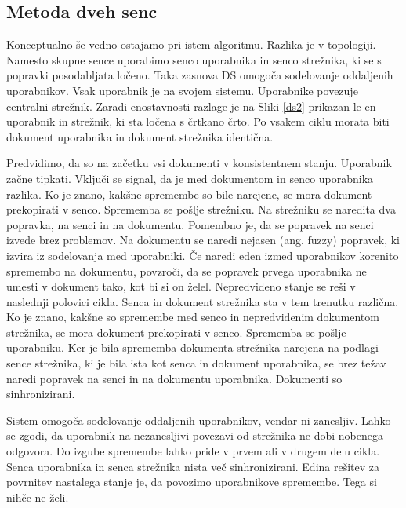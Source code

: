 \documentclass[a4paper, 12pt, twoside]{book}
\begin{document}
\subsection{Metoda dveh senc}

Konceptualno še vedno ostajamo pri istem algoritmu. Razlika je v topologiji. Namesto skupne sence uporabimo senco uporabnika in senco strežnika, ki se s popravki posodabljata ločeno. Taka zasnova DS omogoča sodelovanje oddaljenih uporabnikov. Vsak uporabnik je na svojem sistemu. Uporabnike povezuje centralni strežnik. Zaradi enostavnosti razlage je na Sliki \ref{ds2} prikazan le en uporabnik in strežnik, ki sta ločena s črtkano črto. Po vsakem ciklu morata biti dokument uporabnika in dokument strežnika identična.

Predvidimo, da so na začetku vsi dokumenti v konsistentnem stanju. Uporabnik začne tipkati. Vključi se signal, da je med dokumentom in senco uporabnika razlika. Ko je znano, kakšne spremembe so bile narejene, se mora dokument prekopirati v senco. Sprememba se pošlje strežniku. Na strežniku se naredita dva popravka, na senci in na dokumentu. Pomembno je, da se popravek na senci izvede brez problemov. Na dokumentu se naredi nejasen (ang. fuzzy) popravek, ki izvira iz sodelovanja med uporabniki. Če naredi eden izmed uporabnikov korenito spremembo na dokumentu, povzroči, da se popravek prvega uporabnika ne umesti v dokument tako, kot bi si on želel. Nepredvideno stanje se reši v naslednji polovici cikla. Senca in dokument strežnika sta v tem trenutku različna. Ko je znano, kakšne so spremembe med senco in nepredvidenim dokumentom strežnika, se mora dokument prekopirati v senco. Sprememba se pošlje uporabniku. Ker je bila sprememba dokumenta strežnika narejena na podlagi sence strežnika, ki je bila ista kot senca in dokument uporabnika, se brez težav naredi popravek na senci in na dokumentu uporabnika. Dokumenti so sinhronizirani.

Sistem omogoča sodelovanje oddaljenih uporabnikov, vendar ni zanesljiv. Lahko se zgodi, da uporabnik na nezanesljivi povezavi od strežnika ne dobi nobenega odgovora. Do izgube spremembe lahko pride v prvem ali v drugem delu cikla. Senca uporabnika in senca strežnika nista več sinhronizirani. Edina rešitev za povrnitev nastalega stanje je, da povozimo uporabnikove spremembe. Tega si nihče ne želi.
\end{document}
